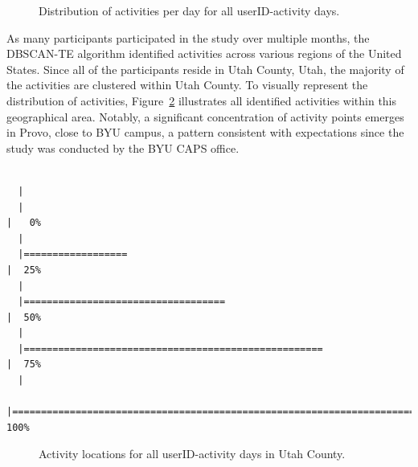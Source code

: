 \documentclass[
  letterpaper,
  number,
  review,
  3p]{elsarticle}
\begin{document}
\begin{figure}[H]


\caption{\label{fig-numAct}Distribution of activities per day for all
userID-activity days.}

\end{figure}%

As many participants participated in the study over multiple months, the
DBSCAN-TE algorithm identified activities across various regions of the
United States. Since all of the participants reside in Utah County,
Utah, the majority of the activities are clustered within Utah County.
To visually represent the distribution of activities,
Figure~\ref{fig-actLocs} illustrates all identified activities within
this geographical area. Notably, a significant concentration of activity
points emerges in Provo, close to BYU campus, a pattern consistent with
expectations since the study was conducted by the BYU CAPS office.

\begin{verbatim}

  |                                                                            
  |                                                                      |   0%
  |                                                                            
  |==================                                                    |  25%
  |                                                                            
  |===================================                                   |  50%
  |                                                                            
  |====================================================                  |  75%
  |                                                                            
  |======================================================================| 100%
\end{verbatim}

\begin{figure}[H]


\caption{\label{fig-actLocs}Activity locations for all userID-activity
days in Utah County.}

\end{figure}%
\end{document}
